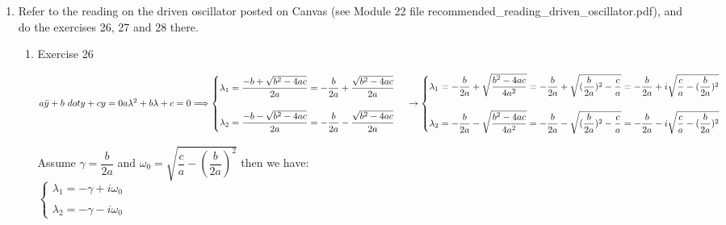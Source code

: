 \documentclass[fleqn]{article}
\begin{document}
\begin{enumerate}
    \item Refer to the reading on the driven oscillator posted on Canvas (see Module 22 file recommended\_reading\_driven\_oscillator.pdf), and do the exercises 26, 27 and 28 there.

      \begin{enumerate}
        \item Exercise 26

          \textcolor{hwColor}{
            $
              a\ddot y+b\ dot y+cy=0 \\
              \\
              a \lambda^2+b \lambda+c=0 \Longrightarrow \begin{cases}
                \lambda_1=\dfrac{-b+\sqrt{b^2-4ac}}{2a}=-\dfrac{b}{2a}+\dfrac{\sqrt{b^2-4ac}}{2a} \\
                \\
                \lambda_2=\dfrac{-b-\sqrt{b^2-4ac}}{2a}=-\dfrac{b}{2a}-\dfrac{\sqrt{b^2-4ac}}{2a}
              \end{cases} \\
              \\
              \\
              \rightarrow \begin{cases}
                \lambda_1=-\dfrac{b}{2a}+\sqrt{\dfrac{b^2-4ac}{4a^2}}=-\dfrac{b}{2a}+\sqrt{(\dfrac{b}{2a})^2-\dfrac{c}{a}}=-\dfrac{b}{2a}+i\sqrt{\dfrac{c}{a}-(\dfrac{b}{2a})^2} \\
                \\
                \lambda_2=-\dfrac{b}{2a}-\sqrt{\dfrac{b^2-4ac}{4a^2}}=-\dfrac{b}{2a}-\sqrt{(\dfrac{b}{2a})^2-\dfrac{c}{a}}=-\dfrac{b}{2a}-i\sqrt{\dfrac{c}{a}-(\dfrac{b}{2a})^2}
              \end{cases} \\
            $
          }

          \bigbreak

          \textcolor{hwColor}{
            Assume $\gamma=\dfrac{b}{2a}$ and $\omega_0=\sqrt{\dfrac{c}{a}-(\dfrac{b}{2a})^2}$ then we have: \\
            $
              \begin{cases}
                \lambda_1=-\gamma+i\omega_0 \\
                \\
                \lambda_2=-\gamma-i\omega_0
              \end{cases}
            $
          }


\end{enumerate}
\end{enumerate}
\end{document}
